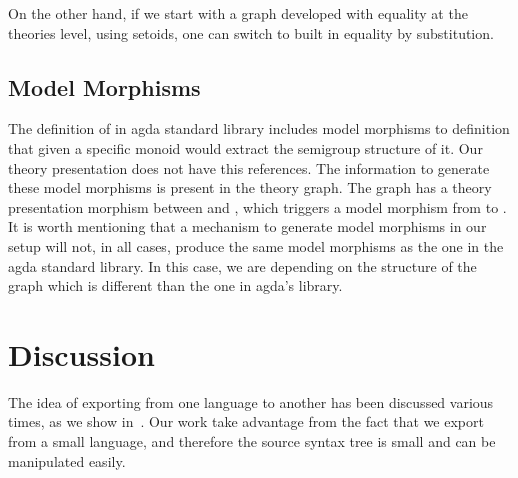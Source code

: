 On the other hand, if we start with a graph developed with equality at the theories level, using setoids, one can switch to built in equality by substitution. 





\subsection{Model Morphisms} 
\label{subsec:model-morph}
\label{subsec:agda:modelMorphisms}
The definition of  in agda standard library includes model morphisms to   definition that given a specific monoid would extract the semigroup structure of it. Our theory presentation does not have this references. The information to generate these model morphisms is present in the theory graph. The graph has a theory presentation morphism between  and , which triggers a model morphism from  to . It is worth mentioning that a mechanism to generate model morphisms in our setup will not, in all cases, produce the same model morphisms as the one in the agda standard library. In this case, we are depending on the structure of the graph which is different than the one in agda's library. 


\section{Discussion}
\label{sec:exporting:discussion}
The idea of exporting from one language to another has been discussed various times, as we show in~. Our work take advantage from the fact that we export from a small language, and therefore the source syntax tree is small and can be manipulated easily.  

